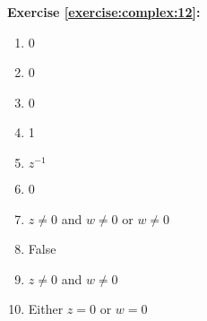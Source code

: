 \noindent\textbf{Exercise \ref{exercise:complex:12}:}
\begin{multicols}{3}
\begin{enumerate}
\item
0

\item
0

\item
0

\item
1

\item
$z^{-1}$

\item
0

\item
$z \neq 0$ and $w \neq 0$ or $w \neq 0$

\item
False

\item
$z \neq 0$ and $w \neq 0$

\item
Either $z=0$ or $w=0$
\end{enumerate}
\end{multicols}


